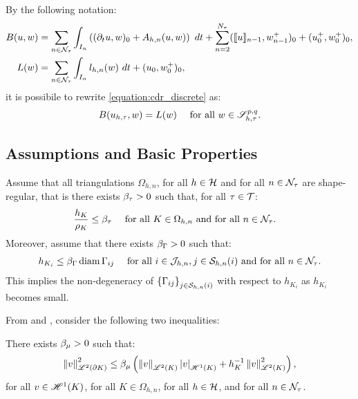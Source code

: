 By the following notation:
\begin{align}
    B(u, w) &= \sum_{n \in \mathcal{N}_{\tau}} \int_{I_n} \left( (\partial_t u, w )_0 + A_{h, n}(u, w) \right) ~ dt + \sum_{n = 2}^{N_{\tau}} (\llbracket u \rrbracket_{n - 1}, w_{n - 1}^+ )_0 + (u_0^+, w_0^+ )_0, \label{equation:cdr_B} \\
    L(w) &= \sum_{n \in \mathcal{N}_{\tau}} \int_{I_n} l_{h, n}(w) ~ dt + (u_0, w_0^+ )_0 \label{equation:cdr_L},
\end{align}
it is possibile to rewrite \cref{equation:cdr_discrete} as:
\begin{align}
    B(u_{h, \tau}, w) &= L(w) &\text{ for all } w \in \mathscr{S}^{p, q}_{h, \tau}. \label{equation:cdr_discrete_short}
\end{align}

\newpage
\subsection{Assumptions and Basic Properties}

Assume that all triangulations $\Omega_{h, n}$, for all $h \in \mathcal{H}$ and for all $n \in \mathcal{N}_{\tau}$ are shape-regular, that is there exists $\beta_{\tau} > 0$ such that, for all $\tau \in \mathcal{T}$:
\begin{align}
    \frac{h_K}{\rho_K} &\leq \beta_{\tau} &\text{ for all } K \in \Omega_{h, n} \text{ and for all } n \in \mathcal{N}_{\tau}. \label{equation:ass_h}
&\end{align}
Moreover, assume that there exists $\beta_{\Gamma} > 0$ such that:
\begin{align}
    h_{K_i} &\leq \beta_{\Gamma} \operatorname*{diam} \Gamma_{ij} &\text{ for all } i \in \mathcal{J}_{h, n}, j \in \mathcal{S}_{h, n}(i) \text{ and for all } n \in \mathcal{N}_{\tau}. \label{equation:ass_hd}
\end{align}
This implies the non-degeneracy of $\left\{ \Gamma_{ij} \right\}_{j \in \mathcal{S}_{h, n}(i)}$ with respect to $h_{K_i}$ as $h_{K_i}$ becomes small.

From \cite{Dolejší2002} and \cite{Ciarlet1978}, consider the following two inequalities:

\begin{lemma}
    There exists $\beta_{\mu} > 0$ such that:
    \begin{align}
        \left\lVert v \right\rVert_{\mathscr{L}^{2}(\partial K)}^2 \leq \beta_{\mu} \left( \left\lVert v \right\rVert_{\mathscr{L}^{2}(K)} \left\lvert v \right\rvert_{\mathscr{H}^{1}(K)} + h_K^{-1} \left\lVert v \right\rVert_{\mathscr{L}^{2}(K)}^2 \right),
    \end{align}
    for all $v \in \mathscr{H}^{1}(K)$, for all $K \in \Omega_{h, n}$, for all $h \in \mathcal{H}$, and for all $n \in \mathcal{N}_{\tau}$.
\end{lemma}

